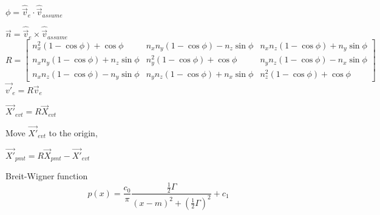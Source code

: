 $\phi=\hat{\vec{v}}_e\cdot\hat{\vec{v}}_{assume}$

$\vec{n}=\hat{\vec{v}}_e\times\hat{\vec{v}}_{assume}$
\[
R=\begin{bmatrix}
	n^2_x(1-\cos\phi)+\cos\phi       &n_xn_y(1-\cos\phi)-n_z\sin\phi & n_xn_z(1-\cos\phi)+n_y\sin\phi \\
	n_xn_y(1-\cos\phi)+n_z\sin\phi & n^2_y(1-\cos\phi)+\cos\phi & n_yn_z(1-\cos\phi)-n_x\sin\phi \\
	n_xn_z(1-\cos\phi)-n_y\sin\phi & n_yn_z(1-\cos\phi)+n_x\sin\phi & n^2_z(1-\cos\phi)+\cos\phi
\end{bmatrix}
\]
$\vec{v'}_e=R\vec{v}_e$

$\vec{X'}_{evt}=R\vec{X}_{evt}$

Move $\vec{X'}_{evt}$ to the origin,

$\vec{X'}_{pmt}=R\vec{X}_{pmt}-\vec{X'}_{evt}$

Breit-Wigner function
\[
p(x) = \frac{c_0}{\pi}\frac{\frac{1}{2} \Gamma}{(x-m)^2 + (\frac{1}{2} \Gamma)^2}+c_1
\]